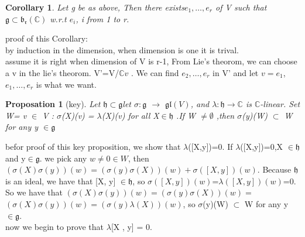 \documentclass[UTF8]{ctexart}
\newtheorem{pro}{Proposation}[section]
\newtheorem{cor}{Corollary}[section]
\begin{document}
\begin{cor}
    Let g be as above, Then there exists{$e_1, \dots ,e_r$} of V such that$ \mathfrak{g} \subset \mathfrak{b_r}(\mathbb{C}) $ w.r.t {$e_i$, i from 1 to r}. 

\end{cor}
    proof of this Corollary:
    \\by induction in the dimension, when dimension is one it is trival. 
    \\assume it is right when dimension of V is r-1, From Lie's theorom, we can choose a v in the lie's theorom. V'=V/$\mathbb{C}v $ .
    We can find {$e_2, \dots , e_r$} in V' and let $v=e_1$, {$e_1, \dots , e_r$} is what we want. 
\begin{pro}[key]
    Let $\mathfrak{h} \subset \mathfrak{g} $let $\sigma :\mathfrak{g}$ $\rightarrow$ $\mathfrak{gl}(V)$, and $\lambda : \mathfrak{h} \rightarrow \mathbb{C}$ is $\mathbb{C}$-linear. 
    Set W= {v $\in$ V : $\sigma$(X)(v) = $\lambda$(X)(v) for all X$ \in \mathfrak{h}$  }.If W $\neq \emptyset$ ,then
    $\sigma$(y)(W) $\subset$ W for any y $\in \mathfrak{g} $
\end{pro}
befor proof of this key proposition, we show that $\lambda $([X,y])=0. If $\lambda $([X,y])=0,X $\in \mathfrak{h}$ and y$ \in \mathfrak{g}$. 
we pick any $ w\neq 0 \in W$, then $(\sigma(X)\sigma(y) )(w) =(\sigma(y)\sigma(X) )(w) +\sigma([X,y])(w)$. Because $\mathfrak{h}$ is an ideal, 
we have that [X, y] $\in \mathfrak{h}$, so $\sigma([X,y])(w)$=$\lambda([X,y])(w)$=0. 
So we have that $(\sigma(X)\sigma(y) )(w) =(\sigma(y)\sigma(X) )(w)=$ $(\sigma(X)\sigma(y) )(w) =(\sigma(y)\lambda(X) )(w) $, 
so  $\sigma$(y)(W) $\subset$ W for any y $\in \mathfrak{g} $. 
\\ now we begin to prove that $\lambda $[X , y] = 0. 
 
\end{document}
